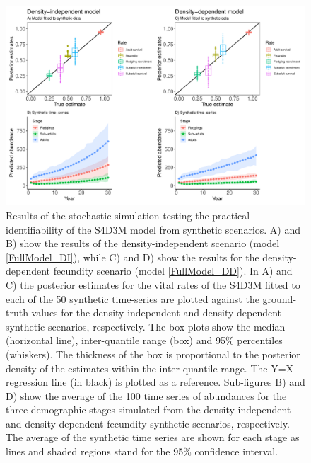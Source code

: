 \documentclass[12pt,a4paper]{article}
\begin{document}
\renewcommand{\thefigure}{S4}
\begin{figure}[htbp]
	\begin{center}
		\includegraphics[width=15cm]{figs/FigS4.pdf}
	\end{center}
	\caption{Results of the stochastic simulation testing the practical identifiability of the S4D3M model from synthetic scenarios. A) and B) show the results of the density-independent scenario (model \ref{FullModel_DI}), while C) and D) show the results for the density-dependent fecundity scenario (model \ref{FullModel_DD}). In A) and C) the posterior estimates for the vital rates of the S4D3M fitted to each of the 50 synthetic time-series are plotted against the ground-truth values for the density-independent and density-dependent synthetic scenarios, respectively. The box-plots show the median (horizontal line), inter-quantile range (box) and 95\% percentiles (whiskers). The thickness of the box is proportional to the posterior density of the estimates within the inter-quantile range. The Y=X regression line (in black) is plotted as a reference. Sub-figures B) and D) show the average of the 100 time series of abundances for the three demographic stages simulated from the density-independent and density-dependent fecundity synthetic scenarios, respectively. The average of the synthetic time series are shown for each stage as lines and shaded regions stand for the 95\% confidence interval. }
\label{fig:FigSupp_PPC}
\end{figure}

\newpage
\end{document}
